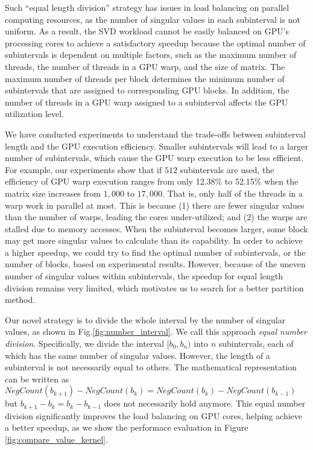 Such ``equal length division'' strategy has issues in load balancing on 
parallel computing resources, as the number of singular values in each
subinterval is not uniform. As a result,
the SVD workload cannot be easily balanced on GPU's processing cores to achieve a satisfactory speedup because the optimal number of subintervals is dependent on multiple factors, such as the maximum number of threads, the number of threads in a GPU warp, and the size of matrix.
The maximum number of threads per block determines the minimum number
of subintervals that are assigned to corresponding GPU blocks.
In addition, the number of threads in a GPU warp assigned to a subinterval affects the GPU utilization level.

We have conducted experiments to understand the trade-offs between subinterval length and the GPU execution efficiency. 
Smaller subintervals will lead to a larger number of subintervals, which cause the GPU warp execution to be less efficient. 
For example, our experiments show that if $512$ subintervals are used, the efficiency of GPU warp execution ranges from only 12.38\% to 52.15\% when the matrix size increases from $1,000$ to $17,000$.
That is, only half of the threads in a warp work in parallel at most. This is because  (1)
 there are fewer singular values than the number of warps, leading the cores under-utilized; and 
(2) the warps are stalled due to memory accesses.
When the subinterval becomes larger, some block may get more singular values to calculate than its capability.
In order to achieve a higher speedup, we could try to find the optimal number of subintervals, or the number of blocks, based on experimental results. 
However, because of the uneven number of singular values within subintervals, the speedup for equal length division remains very limited, which motivates us to search for a better partition method.

Our novel strategy is to divide the whole interval by the number of singular values, as shown in Fig.\ref{fig:number_interval}. We call this approach {\it equal number division}. 
Specifically, we divide the interval $[b_0,b_n)$ into $n$ subintervals, each of which has the same number of singular values. 
However, the length of a subinterval is not necessarily equal to others.
The mathematical representation can be written as $NegCount(b_{k+1})-NegCount(b_{k})=NegCount(b_{k})-NegCount(b_{k-1})$ but $b_{k+1}-b_k = b_{k}-b_{k-1}$ does not necessarily hold anymore.
This equal number division significantly improves the load balancing on GPU cores, helping achieve a better speedup, as we show the performace evaluation in Figure \ref{fig:compare_value_kernel}.

